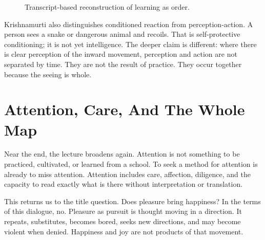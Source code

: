 \begin{figure}
\centering
{}

Transcript-based reconstruction of learning as order.
\end{figure}

Krishnamurti also distinguishes conditioned reaction from perception-action. A person sees a snake or dangerous animal and recoils. That is self-protective conditioning; it is not yet intelligence. The deeper claim is different: where there is clear perception of the inward movement, perception and action are not separated by time. They are not the result of practice. They occur together because the seeing is whole.

\section{Attention, Care, And The Whole Map}

Near the end, the lecture broadens again. Attention is not something to be practiced, cultivated, or learned from a school. To seek a method for attention is already to miss attention. Attention includes care, affection, diligence, and the capacity to read exactly what is there without interpretation or translation.

This returns us to the title question. Does pleasure bring happiness? In the terms of this dialogue, no. Pleasure as pursuit is thought moving in a direction. It repeats, substitutes, becomes bored, seeks new directions, and may become violent when denied. Happiness and joy are not products of that movement.

